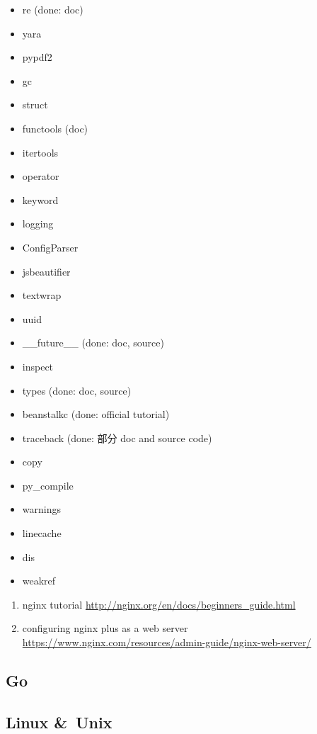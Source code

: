 \documentclass{article}
\begin{document}
\begin{enumerate}
\begin{itemize}
            \item re (done: doc)
            \item yara
            \item pypdf2
            \item gc
            \item struct
            \item functools (doc)
            \item itertools
            \item operator
            \item keyword
            \item logging
            \item ConfigParser
            \item jsbeautifier
            \item textwrap
            \item uuid
            \item __future__ (done: doc, source)
            \item inspect
            \item types (done: doc, source)
            \item beanstalkc (done: official tutorial)
            \item traceback (done: 部分 doc and source code)
            \item copy
            \item py_compile
            \item warnings
            \item linecache
            \item dis
            \item weakref
        \end{itemize}
        \begin{enumerate}
            \item nginx tutorial \url{http://nginx.org/en/docs/beginners_guide.html}
            \item configuring nginx plus as a web server \url{https://www.nginx.com/resources/admin-guide/nginx-web-server/}
        \end{enumerate}
\end{enumerate}
%
\subsection{Go}
%
\subsection{Linux \&\ Unix}
\end{document}
